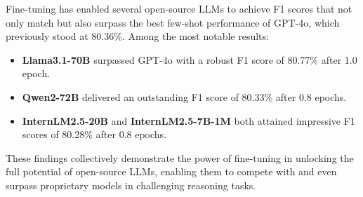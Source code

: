 \documentclass[conference]{IEEEtran}
\begin{document}
Fine-tuning has enabled several open-source LLMs to achieve F1 scores that not only match but also surpass the best few-shot performance of GPT-4o, which previously stood at 80.36\%. Among the most notable results:

\begin{itemize}
    \item \textbf{Llama3.1-70B} surpassed GPT-4o with a robust F1 score of 80.77\% after 1.0 epoch.
    \item \textbf{Qwen2-72B} delivered an outstanding F1 score of 80.33\% after 0.8 epochs.
    \item \textbf{InternLM2.5-20B} and \textbf{InternLM2.5-7B-1M} both attained impressive F1 scores of 80.28\% after 0.8 epochs.
\end{itemize}




These findings collectively demonstrate the power of fine-tuning in unlocking the full potential of open-source LLMs, enabling them to compete with and even surpass proprietary models in challenging reasoning tasks. 
\end{document}
